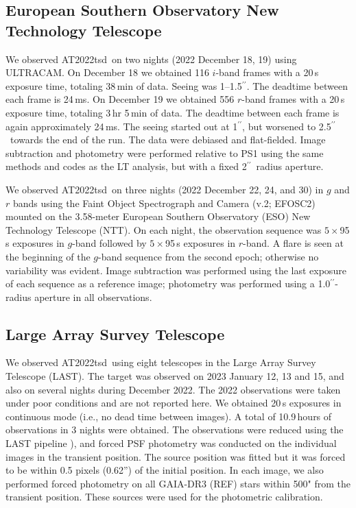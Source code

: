 \documentclass{nature_plusfigure}
\newcommand{\at}{AT2022tsd}
\newcommand{\arcsec}{$^{\prime\prime}$}
\begin{document}
\begin{methods}
\subsection{European Southern Observatory New Technology Telescope}
\label{sec:ntt}

We observed \at\ on two nights (2022 December 18, 19) using ULTRACAM\cite{Dhillon2007}. On December 18 we obtained 116 $i$-band frames with a 20\,s exposure time, totaling 38\,min of data. Seeing was 1--1.5\arcsec. The deadtime between each frame is 24\,ms. On December 19 we obtained 556 $r$-band frames with a 20\,s exposure time, totaling 3\,hr 5\,min of data. The deadtime between each frame is again approximately 24\,ms. The seeing started out at 1\arcsec, but worsened to 2.5\arcsec\ towards the end of the run. The data were debiased and flat-fielded. Image subtraction and photometry were performed relative to PS1 using the same methods and codes as the LT analysis, but with a fixed 2\arcsec\ radius aperture.

We observed \at\ on three nights (2022 December 22, 24, and 30) in $g$ and $r$ bands using the Faint Object Spectrograph and Camera (v.2; EFOSC2\cite{Buzzoni1984}) mounted on the 3.58-meter European Southern Observatory (ESO) New Technology Telescope (NTT). On each night, the observation sequence was $5\times$95\,s exposures in $g$-band followed by $5\times$95\,s exposures in $r$-band.  A flare is seen at the beginning of the $g$-band sequence from the second epoch; otherwise no variability was evident.  Image subtraction was performed using the last exposure of each sequence as a reference image; photometry was performed using a 1.0\arcsec-radius aperture in all observations.

\subsection{Large Array Survey Telescope}
\label{sec:last}

We observed \at\ using eight telescopes in the Large Array Survey Telescope (LAST\cite{Ofek2023,BenAmi2023}).
The target was observed on 2023 January 12, 13 and 15, and also on several nights during December 2022.
The 2022 observations were taken under poor conditions and are not reported here.
We obtained 20\,s exposures in continuous mode (i.e., no dead time between images).
A total of 10.9\,hours of observations in 3 nights were obtained.
The observations were reduced using the LAST pipeline \cite{Ofek2014,Ofek2019,Ofek2023}), and forced PSF photometry was conducted on the individual images
in the transient position. 
The source position was fitted but it was forced to be within 0.5 pixels (0.62'') of the initial position.
In each image, we also performed forced photometry on all GAIA-DR3 (REF) stars
within 500" from the transient position.
These sources were used for the photometric calibration.


\end{methods}
\end{document}
